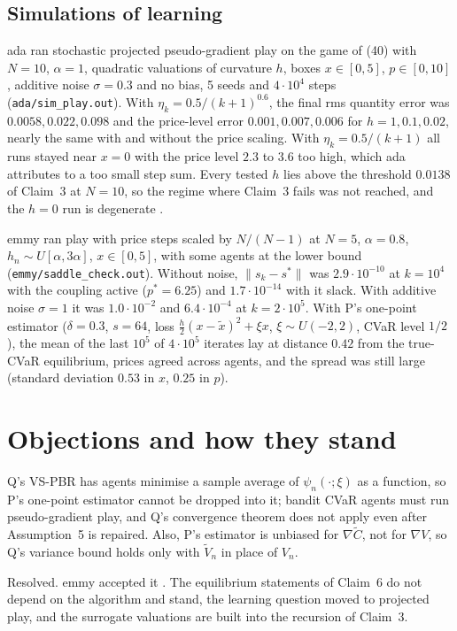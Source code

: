 \documentclass{article}
\begin{document}
\subsection{Simulations of learning}

ada ran stochastic projected pseudo-gradient play on the game of (40) with \(N=10\), \(\alpha=1\), quadratic valuations of curvature \(h\), boxes \(x\in[0,5]\), \(p\in[0,10]\), additive noise \(\sigma=0.3\) and no bias, 5 seeds and \(4\cdot10^4\) steps  (\texttt{ada/sim\_play.out}). With \(\eta_k=0.5/(k+1)^{0.6}\), the final rms quantity error was \(0.0058,0.022,0.098\) and the price-level error \(0.001,0.007,0.006\) for \(h=1,0.1,0.02\), nearly the same with and without the price scaling. With \(\eta_k=0.5/(k+1)\) all runs stayed near \(x=0\) with the price level \(2.3\) to \(3.6\) too high, which ada attributes to a too small step sum. Every tested \(h\) lies above the threshold \(0.0138\) of Claim~3 at \(N=10\), so the regime where Claim~3 fails was not reached, and the \(h=0\) run is degenerate .

emmy ran play with price steps scaled by \(N/(N-1)\) at \(N=5\), \(\alpha=0.8\), \(h_n\sim U[\alpha,3\alpha]\), \(x\in[0,5]\), with some agents at the lower bound  (\texttt{emmy/saddle\_check.out}). Without noise, \(\|s_k-s^\ast\|\) was \(2.9\cdot10^{-10}\) at \(k=10^4\) with the coupling active (\(p^\ast=6.25\)) and \(1.7\cdot10^{-14}\) with it slack. With additive noise \(\sigma=1\) it was \(1.0\cdot10^{-2}\) and \(6.4\cdot10^{-4}\) at \(k=2\cdot10^5\). With P's one-point estimator (\(\delta=0.3\), \(s=64\), loss \(\tfrac h2(x-\tilde x)^2+\xi x\), \(\xi\sim U(-2,2)\), CVaR level \(1/2\)), the mean of the last \(10^5\) of \(4\cdot10^5\) iterates lay at distance \(0.42\) from the true-CVaR equilibrium, prices agreed across agents, and the spread was still large (standard deviation \(0.53\) in \(x\), \(0.25\) in \(p\)).

\section{Objections and how they stand}

\begin{objection}
Q's VS-PBR has agents minimise a sample average of \(\psi_n(\cdot;\xi)\) as a function, so P's one-point estimator cannot be dropped into it; bandit CVaR agents must run pseudo-gradient play, and Q's convergence theorem does not apply even after Assumption~5 is repaired. Also, P's estimator is unbiased for \(\nabla\widetilde C\), not for \(\nabla V\), so Q's variance bound holds only with \(\widetilde V_n\) in place of \(V_n\). 
\end{objection}
Resolved. emmy accepted it . The equilibrium statements of Claim~6 do not depend on the algorithm and stand, the learning question moved to projected play, and the surrogate valuations are built into the recursion of Claim~3.
\end{document}
